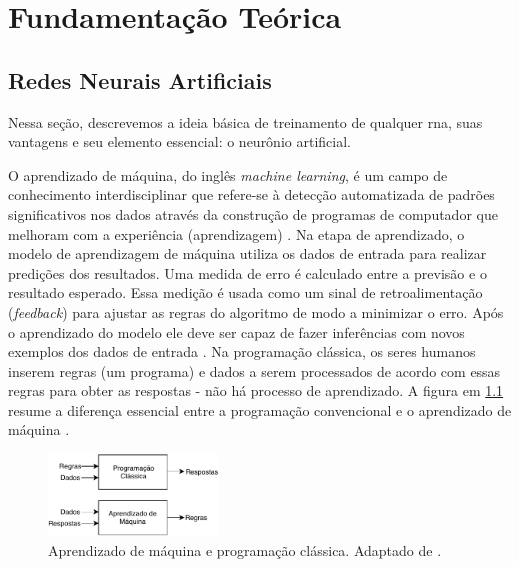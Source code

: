 \chapter{Fundamentação Teórica}


\section{Redes Neurais Artificiais}
Nessa seção, descrevemos a ideia básica de treinamento de qualquer \acrshort{rna}, suas vantagens e seu elemento essencial: o neurônio artificial. 


O aprendizado de máquina, do inglês \textit{machine learning}, é um campo de conhecimento interdisciplinar que refere-se à detecção automatizada de padrões significativos nos dados através da construção de programas de computador que melhoram com a experiência (aprendizagem) \cite{shalev2014understanding}. 
Na etapa de aprendizado, o modelo de aprendizagem de máquina  utiliza os dados de entrada para realizar predições dos resultados. Uma medida de erro é calculado entre a previsão e o resultado esperado. Essa medição é usada como um sinal de retroalimentação (\textit{feedback}) para ajustar as regras  do algoritmo de modo a minimizar o erro. Após o aprendizado do modelo ele deve ser capaz de fazer inferências com novos exemplos dos dados de entrada \cite{FrancoisDeepLearning}.
Na programação clássica, os seres humanos inserem regras (um programa) e dados a serem processados de acordo com essas regras para obter as respostas  -  não há processo de aprendizado. A figura em \ref{fig:machinelearning} resume a diferença essencial entre a programação convencional e o aprendizado de máquina \cite{FrancoisDeepLearning}.  


\begin{figure}[h]
	\centering
	\includegraphics[width=0.4\textwidth]{figuras/MachineLearning.pdf}
	\caption[Aprendizagem de máquina]{Aprendizado de máquina e programação clássica. Adaptado de \cite{FrancoisDeepLearning}.}
	\label{fig:machinelearning}
\end{figure}


